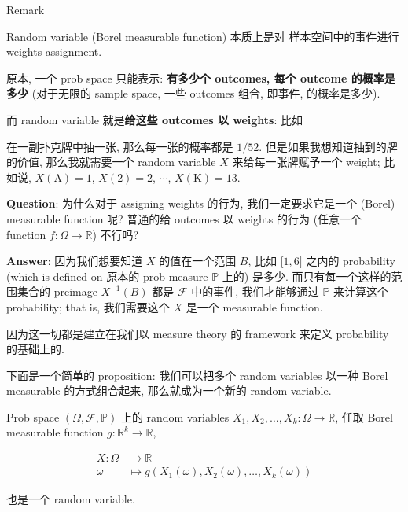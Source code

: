 \begin{qlremark}{Remark}

Random variable (Borel measurable function) 本质上是对 样本空间中的事件进行 weights assignment.

原本, 一个 prob space 只能表示: \textbf{有多少个 outcomes, 每个 outcome 的概率是多少} (对于无限的 sample space, 一些 outcomes 组合, 即事件, 的概率是多少).

而 random variable 就是\textbf{给这些 outcomes 以 weights}: 比如

\begin{example}

在一副扑克牌中抽一张, 那么每一张的概率都是 \(1/52\). 但是如果我想知道抽到的牌的价值, 那么我就需要一个 random variable \(\mathit{X}\) 来给每一张牌赋予一个 weight; 比如说, \(\mathit{X}(\text{A}) = 1\), \(\mathit{X}(2) = 2\), \(\cdots\), \(\mathit{X}(\text{K}) = 13\).\\

\end{example}

\textbf{Question}: 为什么对于 assigning weights 的行为, 我们一定要求它是一个 (Borel) measurable function 呢? 普通的给 outcomes 以 weights 的行为 (任意一个 function \(\mathit{f}:\Omega\rightarrow\mathbb{R}\)) 不行吗?

\textbf{Answer}: 因为我们想要知道 \(\mathit{X}\) 的值在一个范围 \(\mathit{B}\), 比如 \(\lbrack 1,6\rbrack\) 之内的 probability (which is defined on 原本的 prob measure \(\mathbb{P}\) 上的) 是多少. 而只有每一个这样的范围集合的 preimage \(\mathit{X}^{- 1}(\mathit{B})\) 都是 \(\mathcal{F}\) 中的事件, 我们才能够通过 \(\mathbb{P}\) 来计算这个 probability; that is, 我们需要这个 \(\mathit{X}\) 是一个 measurable function.

因为这一切都是建立在我们以 measure theory 的 framework 来定义 probability 的基础上的.\\

\end{qlremark}

下面是一个简单的 proposition: 我们可以把多个 random variables 以一种 Borel measurable 的方式组合起来, 那么就成为一个新的 random variable.

\begin{proposition}{}

Prob space \((\Omega,\mathcal{F},\mathbb{P})\) 上的 random variables \(\mathit{X}_{1},\mathit{X}_{2},\ldots,\mathit{X}_{\mathit{k}}:\Omega\rightarrow\mathbb{R}\), 任取 Borel measurable function \(\mathit{g}:\mathbb{R}^{\mathit{k}}\rightarrow\mathbb{R}\),

\[\begin{matrix}
{\mathit{X}:\Omega} & {\rightarrow\mathbb{R}} \\
\mathit{\omega} & {\mapsto\mathit{g}(\mathit{X}_{1}(\mathit{\omega}),\mathit{X}_{2}(\mathit{\omega}),\ldots,\mathit{X}_{\mathit{k}}(\mathit{\omega}))}
\end{matrix}\]

也是一个 random variable.

\end{proposition}

